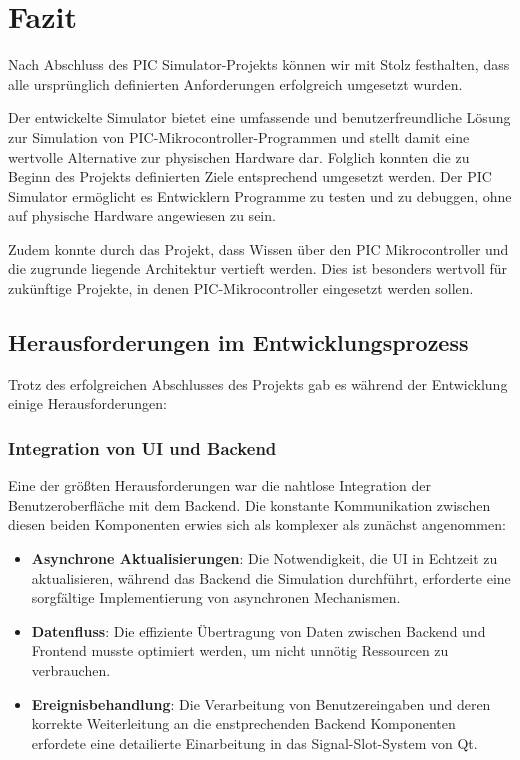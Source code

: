 \chapter{Fazit}

Nach Abschluss des PIC Simulator-Projekts können wir mit Stolz festhalten, dass alle ursprünglich definierten Anforderungen erfolgreich umgesetzt wurden. 

Der entwickelte Simulator bietet eine umfassende und benutzerfreundliche Lösung zur Simulation von PIC-Mikrocontroller-Programmen und stellt damit eine wertvolle Alternative zur physischen Hardware dar. Folglich konnten die zu Beginn des Projekts definierten Ziele entsprechend umgesetzt werden. Der PIC Simulator ermöglicht es Entwicklern Programme zu testen und zu debuggen, ohne auf physische Hardware angewiesen zu sein.

Zudem konnte durch das Projekt, dass Wissen über den PIC Mikrocontroller und die zugrunde liegende Architektur vertieft werden. Dies ist besonders wertvoll für zukünftige Projekte, in denen PIC-Mikrocontroller eingesetzt werden sollen.

\section{Herausforderungen im Entwicklungsprozess}

Trotz des erfolgreichen Abschlusses des Projekts gab es während der Entwicklung einige Herausforderungen:

\subsection{Integration von UI und Backend}

Eine der größten Herausforderungen war die nahtlose Integration der Benutzeroberfläche mit dem Backend. Die konstante Kommunikation zwischen diesen beiden Komponenten erwies sich als komplexer als zunächst angenommen:

\begin{itemize}
    \item \textbf{Asynchrone Aktualisierungen}: Die Notwendigkeit, die UI in Echtzeit zu aktualisieren, während das Backend die Simulation durchführt, erforderte eine sorgfältige Implementierung von asynchronen Mechanismen.
    \item \textbf{Datenfluss}: Die effiziente Übertragung von Daten zwischen Backend und Frontend musste optimiert werden, um nicht unnötig Ressourcen zu verbrauchen.
    \item \textbf{Ereignisbehandlung}: Die Verarbeitung von Benutzereingaben und deren korrekte Weiterleitung an die enstprechenden Backend Komponenten erfordete eine detailierte Einarbeitung in das Signal-Slot-System von Qt.
\end{itemize}

